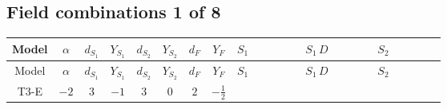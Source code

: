 \documentclass[8pt]{article}
\begin{document}
\begin{landscape}
\subsection*{Field combinations 1 of 8}
\begin{longtable}{@{}cccccccc >{\raggedright\arraybackslash}p{0.21\linewidth} >{\raggedright\arraybackslash}p{0.21\linewidth} >{\raggedright\arraybackslash}p{0.21\linewidth}@{}}
\toprule
Model & $\alpha$ & $d_{S_1}$ & $Y_{S_1}$ & $d_{S_2}$ & $Y_{S_2}$ & $d_F$ & $Y_F$ & $S_1$ & $S_1\,D$ & $S_2$ \\
\midrule
\endfirsthead
\toprule
Model & $\alpha$ & $d_{S_1}$ & $Y_{S_1}$ & $d_{S_2}$ & $Y_{S_2}$ & $d_F$ & $Y_F$ & $S_1$ & $S_1\,D$ & $S_2$ \\
\midrule
\endhead
T3-E & $-2$ & $3$ & $-1$ & $3$ & $0$ & $2$ & $-\frac{1}{2}$ & \scriptsize\adjustbox{max width=\linewidth}{$\begin{gathered} +\frac{2 \hbar  \overline{y_{1,i_1,r_1}} \overline{y_{1,i_2,r_2}} S_{1,j_2}^2 y_{1,i_1,r_2} y_{1,i_2,r_1} \left(S_{1,j_1}{}^{\dagger }\right){}^2}{3 \epsilon } \\ -C_{S_1^\dagger S_1} S_{1,j_1} S_{1,j_1}{}^{\dagger } \\ +\frac{C_{S_1^\dagger S_1} \hbar  \overline{y_{1,i_1,r_1}} S_{1,j_1} y_{1,i_1,r_1} S_{1,j_1}{}^{\dagger }}{\sqrt{3}}\end{gathered}$} & \scriptsize\adjustbox{max width=\linewidth}{$\begin{gathered} +D_{\mu _1}\left(S_{1,j_1}\right){}^{\dagger } D_{\mu _1}\left(S_{1,j_1}\right)\end{gathered}$} & \scriptsize\adjustbox{max width=\linewidth}{$\begin{gathered} +\frac{2 \hbar  \overline{y_{2,i_1,r_1}} \overline{y_{2,i_2,r_2}} S_{2,j_2}^2 y_{2,i_1,r_2} y_{2,i_2,r_1} \left(S_{2,j_1}{}^{\dagger }\right){}^2}{3 \epsilon } \\ -C_{S_2^\dagger S_2} S_{2,j_1} S_{2,j_1}{}^{\dagger } \\ +\frac{C_{S_2^\dagger S_2} \hbar  \overline{y_{2,i_1,r_1}} S_{2,j_1} y_{2,i_1,r_1} S_{2,j_1}{}^{\dagger }}{\sqrt{3}}\end{gathered}$} \\

\end{longtable}
\end{landscape}
\end{document}
